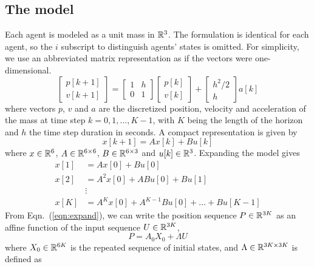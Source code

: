 \subsection{The model}
Each agent is modeled as a unit mass in ${\mathbb R}^3$. The formulation is identical for each agent, so the $i$ subscript to distinguish agents' states is omitted. For simplicity, we use an abbreviated matrix representation as if the vectors were one-dimensional. 
\begin{equation}
\label{eqn: model}
\begin{bmatrix}
p[k+1]\\
v[k+1]
\end{bmatrix} = \begin{bmatrix}
1 & h\\
0 & 1
\end{bmatrix} \begin{bmatrix}
p[k] \\
v[k]
\end{bmatrix} + \begin{bmatrix}
h^2/2 \\
h
\end{bmatrix}a[k]
\end{equation}
where vectors $p$, $v$ and $a$ are the discretized position, velocity and acceleration of the mass at time step $k = {0,1,\ldots,K-1}$, with $K$ being the length of the horizon and $h$ the time step duration in seconds. A compact representation is given by
\begin{equation}
x[k+1] = Ax[k] + Bu[k] 
\end{equation}
where $x \in {\mathbb R}^{6}$, $A \in {\mathbb R}^{6\times 6} $, $B \in {\mathbb R}^{6\times 3}$ and $u[k] \in {\mathbb R}^{3}$. Expanding the model gives
\begin{equation}
\label{eqn:expand}
\begin{aligned}
x[1] &= Ax[0] + Bu[0]\\
x[2] &= A^2x[0] + ABu[0] + Bu[1]\\
&\vdots\\
x[K] &= A^{K}x[0] + A^{K-1}Bu[0] + \ldots + Bu[K-1]
\end{aligned}
\end{equation}
From Eqn.~(\ref{eqn:expand}), we can write the position sequence $P \in {\mathbb R}^{3K}$ as an affine function of the input sequence $U \in {\mathbb R}^{3K}$,
\begin{equation}
\label{eqn:model}
P = A_0X_0 + \Lambda U
\end{equation}
where $X_0 \in {\mathbb R}^{6K}$ is the repeated sequence of initial states, and $\Lambda \in {\mathbb R}^{3K \times 3K}$ is defined as
